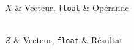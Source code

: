 \begin{tabarg}
\\
\hline
$X$ & Vecteur, {\tt float} & Op\'erande\\
\end{tabarg}

\medskip
\begin{tabarg}
\\
\hline
$Z$ & Vecteur, {\tt float} & R\'esultat\\
\end{tabarg}
